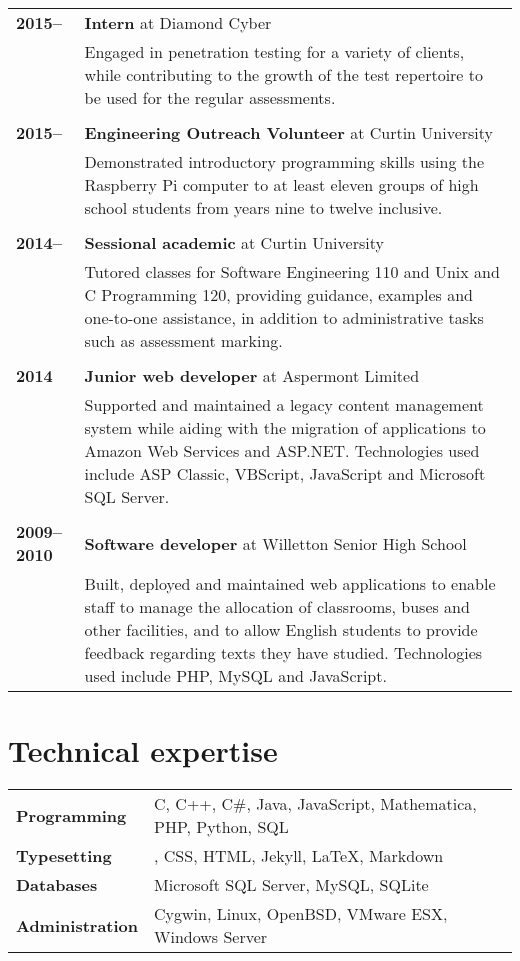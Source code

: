 \documentclass[a4paper,12pt]{article}
\begin{document}
\begin{tabular}{p{3.5cm}p{12.5cm}}
	\textbf{2015--} &
		\textbf{Intern} at Diamond Cyber\\ &
		Engaged in penetration testing for a variety of clients, while
		contributing to the growth of the test repertoire to be used
		for the regular assessments.\\\\
	\textbf{2015--} &
		\textbf{Engineering Outreach Volunteer} at Curtin University\\ &
		Demonstrated introductory programming skills using the
		Raspberry Pi computer to at least eleven groups of high school
		students from years nine to twelve inclusive.\\\\
	\textbf{2014--} &
		\textbf{Sessional academic} at Curtin University\\ &
		Tutored classes for Software Engineering 110 and Unix and C
		Programming 120, providing guidance, examples and one-to-one
		assistance, in addition to administrative tasks such as
		assessment marking.\\\\
	\textbf{2014} &
		\textbf{Junior web developer} at Aspermont Limited\\ &
		Supported and maintained a legacy content management system
		while aiding with the migration of applications to Amazon Web
		Services and ASP.NET. Technologies used include ASP Classic,
		VBScript, JavaScript and Microsoft SQL Server.\\\\
	\textbf{2009--2010} &
		\textbf{Software developer} at Willetton Senior High School\\ &
		Built, deployed and maintained web applications to enable staff
		to manage the allocation of classrooms, buses and other
		facilities, and to allow English students to provide feedback
		regarding texts they have studied. Technologies used include
		PHP, MySQL and JavaScript.\\
\end{tabular}

\section*{Technical expertise}

\begin{tabular}{p{3.5cm}p{12.5cm}}
	\textbf{Programming} &
		C, C++, C\#, Java, JavaScript, Mathematica, PHP, Python, SQL \\
	\textbf{Typesetting} &
		\hologo{BibTeX}, CSS, HTML, Jekyll, \LaTeX, Markdown \\
	\textbf{Databases} &
		Microsoft SQL Server, MySQL, SQLite \\
	\textbf{Administration} &
		Cygwin, Linux, OpenBSD, VMware ESX, Windows Server
\end{tabular}
\end{document}
